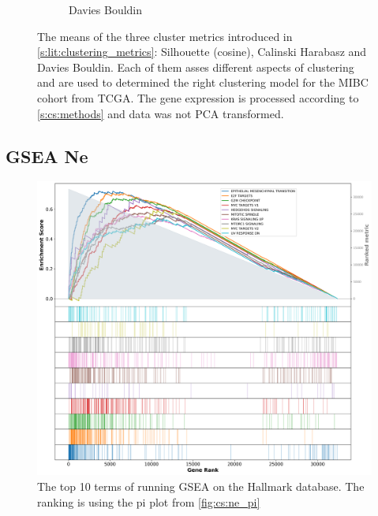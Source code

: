 \begin{figure}[!h]
\begin{subfigure}[!t]{0.3\textwidth}
        \caption{Davies Bouldin}
        \label{fig:ap:dav_boul}
    \end{subfigure}
    \caption{The means of the three cluster metrics introduced in \cref{s:lit:clustering_metrics}: Silhouette (cosine), Calinski Harabasz and Davies Bouldin. Each of them asses different aspects of clustering and are used to determined the right clustering model for the MIBC cohort from TCGA. The gene expression is processed according to \cref{s:cs:methods} and data was not PCA transformed.}
    \label{fig:ap:non_pca_metrics}
\end{figure}


\subsection{GSEA Ne} \label{s:ap:cs:gsea_ne}

\begin{figure}[!htb]    
    \centering
\includegraphics[width=1.0\textwidth,keepaspectratio]{Sections/ClusteringAnalysis/Resources/discussion/other_groups/ne2_hallmark_10_top.png}
    \caption{The top 10 terms of running GSEA on the Hallmark database. The ranking is using the pi plot from \cref{fig:cs:ne_pi}}
    \label{fig:ap:cs:gsea_ne_hallmark}
\end{figure}


